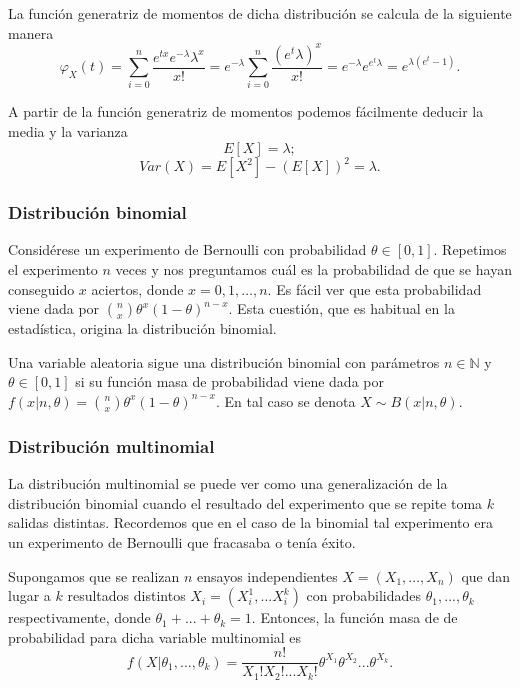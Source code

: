         La función generatriz de momentos de dicha distribución se calcula de la siguiente manera \[\varphi_X(t) = \sum^n_{i=0} \frac{e^{tx}e^{-\lambda}{\lambda}^x}{x!} = e^{-\lambda} \sum^n_{i=0}   \frac{(e^{t}  \lambda)^x}{x!} =  e^{-\lambda}  e ^{e^{t} \lambda} = e ^{\lambda (e^t -1 )}.\]

        A partir de la función generatriz de momentos podemos fácilmente deducir la media y la varianza
        \[E[X] = \lambda;\]
        \[Var(X) =  E[X^2] - (E[X])^2 =  \lambda.\]

\subsubsection{Distribución binomial}

Considérese un experimento de Bernoulli con probabilidad $\theta \in [0,1]$. Repetimos el experimento $n$ veces y nos preguntamos cuál es la probabilidad de que se hayan conseguido $x$ aciertos, donde $x = 0, 1, \ldots, n$. Es fácil ver que esta probabilidad viene dada por $\binom{n}{x} \theta^x (1-\theta)^{n-x}$. Esta cuestión, que es habitual en la estadística, origina la distribución binomial.

\begin{definition}
    Una variable aleatoria sigue una distribución binomial con parámetros $n \in \mathbb{N}$ y $\theta \in [0,1]$  si su función masa de probabilidad viene dada por $f(x|n,\theta) = \binom{n}{x} \theta^x (1-\theta)^{n-x}$. En tal caso se denota $X \sim B(x|n,\theta)$.
\end{definition}

\subsubsection{Distribución multinomial}

	La distribución multinomial se puede ver como una generalización de la distribución binomial cuando el resultado del experimento que se repite toma $k$ salidas distintas. Recordemos que en el caso de la binomial tal experimento era un experimento de Bernoulli que fracasaba o tenía éxito.
    \begin{definition}
        Supongamos que se realizan $n$ ensayos independientes $X = (X_1, \ldots, X_n)$ que dan lugar a $k$ resultados distintos $X_i = (X_i^1, ... X_i^k)$  con probabilidades $\theta_1, ... , \theta_k$ respectivamente, donde $\theta_1+... + \theta_k = 1$. Entonces, la función masa de de probabilidad para dicha variable multinomial es
	    \[f(X|\theta_1, ... , \theta_k) = \frac{n!}{X_1! X_2! ... X_k!} \theta^{X_1} \theta^{X_2} ... \theta^{X_k}.\]
    \end{definition}

